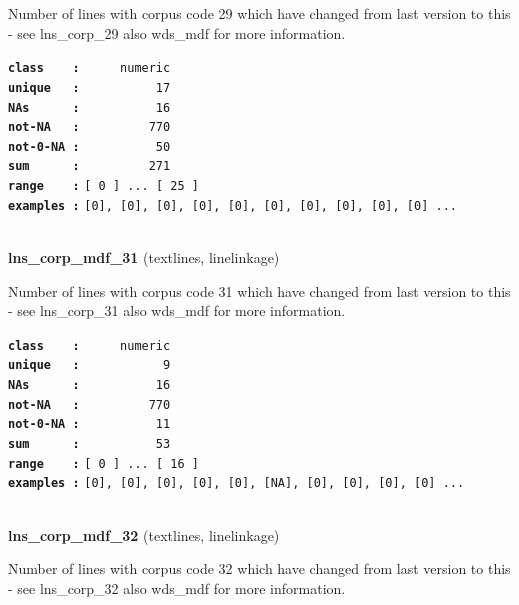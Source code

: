\documentclass[]{article}
\begin{document}
Number of lines with corpus code 29 which have changed from last version
to this - see lns\_corp\_29 also wds\_mdf for more information.

\textbf{\texttt{class\ \ \ \ :}} \texttt{~~~~~numeric}\\
\textbf{\texttt{unique\ \ \ :}} \texttt{~~~~~~~~~~17}\\
\textbf{\texttt{NAs\ \ \ \ \ \ :}} \texttt{~~~~~~~~~~16}\\
\textbf{\texttt{not-NA\ \ \ :}} \texttt{~~~~~~~~~770}\\
\textbf{\texttt{not-0-NA\ :}} \texttt{~~~~~~~~~~50}\\
\textbf{\texttt{sum\ \ \ \ \ \ :}} \texttt{~~~~~~~~~271}\\
\textbf{\texttt{range\ \ \ \ :}}
\texttt{{[}\ 0\ {]}\ ...\ {[}\ 25\ {]}}\\
\textbf{\texttt{examples\ :}}
\texttt{{[}0{]},\ {[}0{]},\ {[}0{]},\ {[}0{]},\ {[}0{]},\ {[}0{]},\ {[}0{]},\ {[}0{]},\ {[}0{]},\ {[}0{]}\ ...}\\

~

\textbf{lns\_corp\_mdf\_31} (textlines, linelinkage)

Number of lines with corpus code 31 which have changed from last version
to this - see lns\_corp\_31 also wds\_mdf for more information.

\textbf{\texttt{class\ \ \ \ :}} \texttt{~~~~~numeric}\\
\textbf{\texttt{unique\ \ \ :}} \texttt{~~~~~~~~~~~9}\\
\textbf{\texttt{NAs\ \ \ \ \ \ :}} \texttt{~~~~~~~~~~16}\\
\textbf{\texttt{not-NA\ \ \ :}} \texttt{~~~~~~~~~770}\\
\textbf{\texttt{not-0-NA\ :}} \texttt{~~~~~~~~~~11}\\
\textbf{\texttt{sum\ \ \ \ \ \ :}} \texttt{~~~~~~~~~~53}\\
\textbf{\texttt{range\ \ \ \ :}}
\texttt{{[}\ 0\ {]}\ ...\ {[}\ 16\ {]}}\\
\textbf{\texttt{examples\ :}}
\texttt{{[}0{]},\ {[}0{]},\ {[}0{]},\ {[}0{]},\ {[}0{]},\ {[}NA{]},\ {[}0{]},\ {[}0{]},\ {[}0{]},\ {[}0{]}\ ...}\\

~

\textbf{lns\_corp\_mdf\_32} (textlines, linelinkage)

Number of lines with corpus code 32 which have changed from last version
to this - see lns\_corp\_32 also wds\_mdf for more information.
\end{document}
